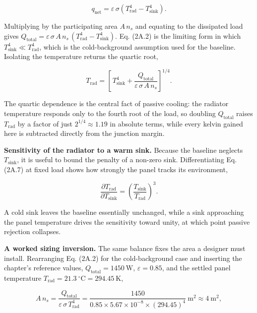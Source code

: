 \documentclass[
  11pt,
  openany,
  oneside]{book}
\begin{document}
\begin{equation}
q_{\mathrm{net}} = \varepsilon\,\sigma\left(T_{\mathrm{rad}}^4 - T_{\mathrm{sink}}^4\right). \tag{2A.6}
\end{equation}

Multiplying by the participating area \(A\,n_s\) and equating to the
dissipated load gives
\(Q_{\mathrm{total}} = \varepsilon\,\sigma\,A\,n_s\,(T_{\mathrm{rad}}^4 - T_{\mathrm{sink}}^4)\).
Eq. (2A.2) is the limiting form in which
\(T_{\mathrm{sink}}^4 \ll T_{\mathrm{rad}}^4\), which is the
cold-background assumption used for the baseline. Isolating the
temperature returns the quartic root,

\begin{equation}
T_{\mathrm{rad}} = \left[\,T_{\mathrm{sink}}^4 + \frac{Q_{\mathrm{total}}}{\varepsilon\,\sigma\,A\,n_s}\right]^{1/4}. \tag{2A.7}
\end{equation}

The quartic dependence is the central fact of passive cooling: the
radiator temperature responds only to the fourth root of the load, so
doubling \(Q_{\mathrm{total}}\) raises \(T_{\mathrm{rad}}\) by a factor
of just \(2^{1/4} \approx 1.19\) in absolute terms, while every kelvin
gained here is subtracted directly from the junction margin.

\textbf{Sensitivity of the radiator to a warm sink.} Because the
baseline neglects \(T_{\mathrm{sink}}\), it is useful to bound the
penalty of a non-zero sink. Differentiating Eq. (2A.7) at fixed load
shows how strongly the panel tracks its environment,

\begin{equation}
\frac{\partial T_{\mathrm{rad}}}{\partial T_{\mathrm{sink}}} = \left(\frac{T_{\mathrm{sink}}}{T_{\mathrm{rad}}}\right)^3. \tag{2A.8}
\end{equation}

A cold sink leaves the baseline essentially unchanged, while a sink
approaching the panel temperature drives the sensitivity toward unity,
at which point passive rejection collapses.

\textbf{A worked sizing inversion.} The same balance fixes the area a
designer must install. Rearranging Eq. (2A.2) for the cold-background
case and inserting the chapter's reference values,
\(Q_{\mathrm{total}} = 1450\ \mathrm{W}\), \(\varepsilon = 0.85\), and
the settled panel temperature
\(T_{\mathrm{rad}} = 21.3\ ^\circ\mathrm{C} = 294.45\ \mathrm{K}\),

\begin{equation}
A\,n_s = \frac{Q_{\mathrm{total}}}{\varepsilon\,\sigma\,T_{\mathrm{rad}}^4}
= \frac{1450}{0.85 \times 5.67\times 10^{-8}\times (294.45)^4}\ \mathrm{m^2} \approx 4\ \mathrm{m^2}, \tag{2A.9}
\end{equation}
\end{document}

